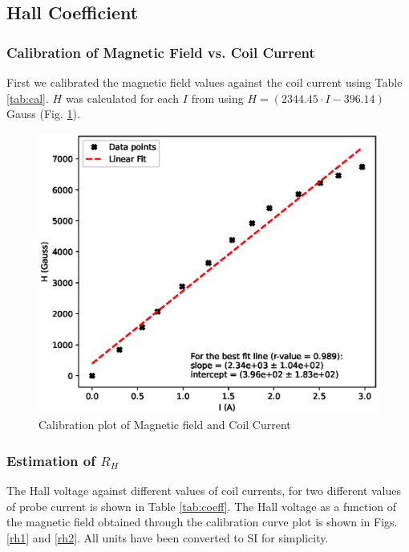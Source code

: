 \subsection{Hall Coefficient}

\subsubsection*{Calibration of Magnetic Field vs. Coil Current}
First we calibrated the magnetic field values against the coil current using Table \ref{tab:cal}. 
$H$ was calculated for each $I$ from using $H = (2344.45\cdot I - 396.14)$ Gauss (Fig. \ref{calf}).


\begin{figure}
    \centering
    \includegraphics[width=1\columnwidth]{images/cal.eps}
    \caption{Calibration plot of Magnetic field and Coil Current}
    \label{calf}
\end{figure}

\subsubsection*{Estimation of $R_H$}
The Hall voltage against different values of coil currents, for two different values of probe current is shown in Table \ref{tab:coeff}. The Hall voltage as a function of the magnetic field obtained through the calibration curve plot is shown in Figs. \ref{rh1} and \ref{rh2}.
All units have been converted to SI for simplicity.

